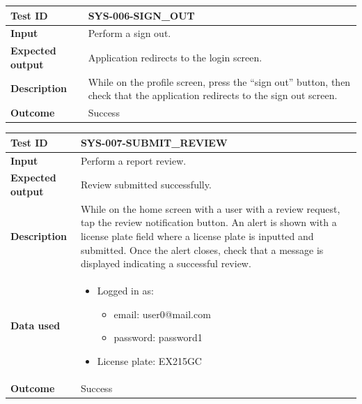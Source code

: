 \begin{table}[H]
    \centering
    \begin{tabular}{p{3cm}p{10cm}}
    \textbf{Test ID} & SYS-006-SIGN\_OUT \\ \hline
    \textbf{Input} & Perform a sign out. \\ \hline
    \textbf{Expected output} & Application redirects to the login screen. \\ \hline
    \textbf{Description} & While on the profile screen, press the “sign out” button, then check that the application redirects to the sign out screen. \\ \hline
    \textbf{Outcome} & Success \\ \hline
    \end{tabular}
\end{table}

\begin{table}[H]
    \centering
    \begin{tabular}{p{3cm}p{10cm}}
    \textbf{Test ID} & SYS-007-SUBMIT\_REVIEW \\ \hline
    \textbf{Input} & Perform a report review. \\ \hline
    \textbf{Expected output} & Review submitted successfully. \\ \hline
    \textbf{Description} & While on the home screen with a user with a review request, tap the review notification button. An alert is shown with a license plate field where a license plate is inputted and submitted. Once the alert closes, check that a message is displayed indicating a successful review. \\ \hline
    \textbf{Data used} & 
        \begin{itemize}[label={}] \itemsep0em
            \item Logged in as:
            \begin{itemize}[label={}] \itemsep0em
                \item email: user0@mail.com
                \item password: password1
            \end{itemize}
            \item License plate: EX215GC
        \end{itemize} \\ \hline
    \textbf{Outcome} & Success \\ \hline
    \end{tabular}
\end{table}

